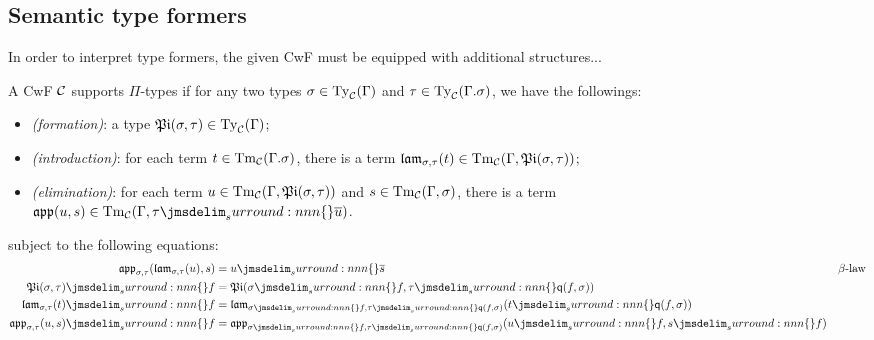 \documentclass[a4paper]{article}
\begin{document}
\subsection{Semantic type formers}\label{sec:stf}

In order to interpret type formers, the given CwF must be equipped with additional structures...

\begin{definition}\label{def:pi}
  A CwF $\mathcal{C}$ supports $\Pi$-types if for any two types $\sigma \in \operatorname{Ty}_{\mathcal{C}}(\Gamma)$ and $\tau \in \operatorname{Ty}_{\mathcal{C}}(\Gamma.\sigma)$, we have the followings:
  \begin{itemize}
  \item \emph{(formation)}: a type $\operatorname{\mathfrak{Pi}}(\sigma,\tau) \in \operatorname{Ty}_{\mathcal{C}}(\Gamma)$;
  \item \emph{(introduction)}: for each term $t \in \operatorname{Tm}_{\mathcal{C}}(\Gamma.\sigma)$, there is a term $\operatorname{\mathfrak{lam}}_{\sigma,\tau}(t) \in \operatorname{Tm}_{\mathcal{C}}(\Gamma,\operatorname{\mathfrak{Pi}}(\sigma,\tau))$;
  \item \emph{(elimination)}: for each term $u \in \operatorname{Tm}_{\mathcal{C}}(\Gamma,\operatorname{\mathfrak{Pi}}(\sigma,\tau))$ and $s \in \operatorname{Tm}_{\mathcal{C}}(\Gamma,\sigma)$, there is a term $\app(u,s) \in \Tm{\cC}(\Gamma,\semSubst{\tau}{\ctxSec{u}})$.
  \end{itemize}
  subject to the following equations:
  \begin{align*}
    \app_{\sigma,\tau}(\lam_{\sigma,\tau}(u),s) &= \semSubst{u}{\ctxSec{s}}
    && \beta\text{-law}\\
    \semSubst{\typePi(\sigma,\tau)}{f} &= \typePi(\semSubst{\sigma}{f},\semSubst{\tau}{\ctxWkn(f,\sigma)})\\
    \semSubst{\lam_{\sigma,\tau}(t)}{f} &= \lam_{\semSubst{\sigma}{f},\semSubst{\tau}{\ctxWkn(f,\sigma)}}(\semSubst{t}{\ctxWkn(f,\sigma)})\\
    \semSubst{\app_{\sigma,\tau}(u,s)}{f} &= \app_{\semSubst{\sigma}{f},\semSubst{\tau}{\ctxWkn(f,\sigma)}}(\semSubst{u}{f},\semSubst{s}{f})
  \end{align*}
\end{definition}
\end{document}
